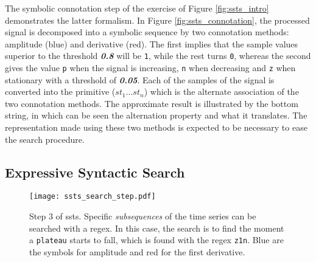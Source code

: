 The symbolic connotation step of the exercise of Figure \ref{fig:ssts_intro} demonstrates the latter formalism. In Figure \ref{fig:ssts_connotation}, the processed signal is decomposed into a symbolic sequence by two connotation methods: amplitude (blue) and derivative (red). The first implies that the sample values superior to the threshold \textit{\textbf{0.8}} will be \texttt{1}, while the rest turns \texttt{0}, whereas the second gives the value \texttt{p} when the signal is increasing, \texttt{n} when decreasing and \texttt{z} when stationary with a threshold of \textit{\textbf{0.05}}. Each of the samples of the signal is converted into the primitive ($st_1...st_n$) which is the alternate association of the two connotation methods. The approximate result is illustrated by the bottom string, in which can be seen the alternation property and what it translates. The representation made using these two methods is expected to be necessary to ease the search procedure.

\subsection{Expressive Syntactic Search}

\begin{figure}
\centering
\texttt{[image: ssts\_search\_step.pdf]}
\caption{Step 3 of \gls{ssts}. Specific \textit{subsequences} of the time series can be searched with a \gls{regex}. In this case, the search is to find the moment a \texttt{plateau} starts to fall, which is found with the \gls{regex} \texttt{z1n}. Blue are the symbols for amplitude and red for the first derivative.}
\label{fig:ssts_search}
\end{figure}

